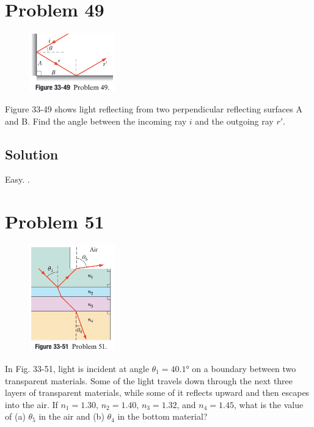 \documentclass[12pt]{article}
\begin{document}
    \pagebreak
    \section{Problem 49}
        \begin{figure}
            \vspace{-30pt}
            \includegraphics[width=0.33\textwidth]{33-49.png} 
        \end{figure}
        Figure 33-49 shows light reflecting from two perpendicular reflecting surfaces A and B. 
        Find the angle between the incoming ray $i$ and the outgoing ray $r'$.

        \subsection{Solution}
            Easy. \boxed{180\unit{\degree}}.

    \pagebreak
    \section{Problem 51}
        \begin{figure}
            \vspace{-60pt}
            \includegraphics[width=0.33\textwidth]{33-51.png} 
        \end{figure}
        In Fig. 33-51, light is incident at angle $\theta_1 = 40.1\unit{\degree}$ on a boundary between two transparent materials. 
        Some of the light travels down through the next three layers of transparent materials, while some of it reflects upward and then escapes into the air. 
        If $n_1 = 1.30$, $n_2 = 1.40$, $n_3 = 1.32$, and $n_4 = 1.45$, what is the value of (a) $\theta_5$ in the air and (b) $\theta_4$ in the bottom material?
\end{document}
